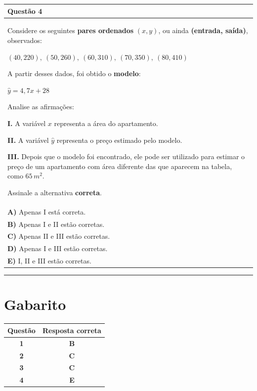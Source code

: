 \documentclass[
]{book}
\begin{document}
\begin{longtable}[]{@{}
  >{\raggedright\arraybackslash}p{}@{}}
\toprule\noalign{}
\begin{minipage}[b]{\linewidth}\raggedright
\textbf{Questão 4}
\end{minipage} \\
\midrule\noalign{}
\endhead
\bottomrule\noalign{}
\endlastfoot
Considere os seguintes \textbf{pares ordenados} \((x,y)\), ou ainda
\textbf{(entrada, saída)}, observados:

\((40,220),\ (50,260),\ (60,310),\ (70,350),\ (80,410)\)

A partir desses dados, foi obtido o \textbf{modelo}:

\(\hat{y}=4{,}7x+28\)

Analise as afirmações:

\textbf{I.} A variável \(x\) representa a área do apartamento.

\textbf{II.} A variável \(\hat{y}\) representa o preço estimado pelo modelo.

\textbf{III.} Depois que o modelo foi encontrado, ele pode ser utilizado
para estimar o preço de um apartamento com área diferente das que
aparecem na tabela, como \(65\,m^2\).

Assinale a alternativa \textbf{correta}. \\
\textbf{A)} Apenas I está correta. \\
\textbf{B)} Apenas I e II estão corretas. \\
\textbf{C)} Apenas II e III estão corretas. \\
\textbf{D)} Apenas I e III estão corretas. \\
\textbf{E)} I, II e III estão corretas. \\
\end{longtable}

\begin{center}\rule{0.5\linewidth}{0.5pt}\end{center}

\chapter{Gabarito}\label{gabarito}

\begin{longtable}[]{@{}cc@{}}
\toprule\noalign{}
\textbf{Questão} & \textbf{Resposta correta} \\
\midrule\noalign{}
\endhead
\bottomrule\noalign{}
\endlastfoot
\textbf{1} & \textbf{B} \\
\textbf{2} & \textbf{C} \\
\textbf{3} & \textbf{C} \\
\textbf{4} & \textbf{E} \\
\end{longtable}
\end{document}
